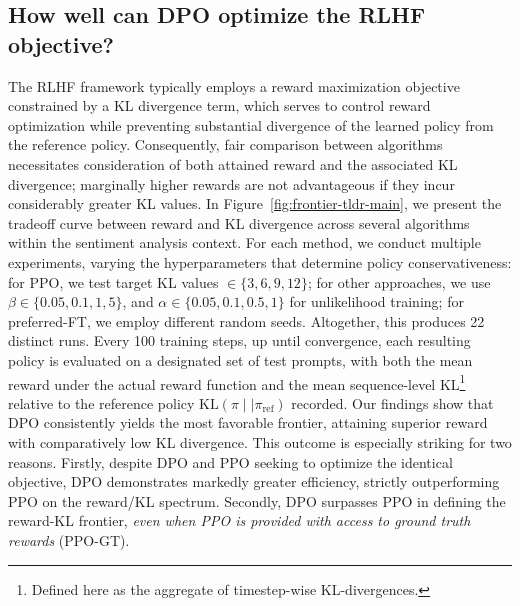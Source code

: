\subsection{How well can DPO optimize the RLHF objective?}

The RLHF framework typically employs a reward maximization objective constrained by a KL divergence term, which serves to control reward optimization while preventing substantial divergence of the learned policy from the reference policy. Consequently, fair comparison between algorithms necessitates consideration of both attained reward and the associated KL divergence; marginally higher rewards are not advantageous if they incur considerably greater KL values. In Figure~\ref{fig:frontier-tldr-main}, we present the tradeoff curve between reward and KL divergence across several algorithms within the sentiment analysis context. For each method, we conduct multiple experiments, varying the hyperparameters that determine policy conservativeness: for PPO, we test target KL values $\in\{3,6,9,12\}$; for other approaches, we use $\beta \in \{0.05,0.1,1,5\}$, and $\alpha\in\{0.05,0.1,0.5,1\}$ for unlikelihood training; for preferred-FT, we employ different random seeds. Altogether, this produces 22 distinct runs. Every 100 training steps, up until convergence, each resulting policy is evaluated on a designated set of test prompts, with both the mean reward under the actual reward function and the mean sequence-level KL\footnote{Defined here as the aggregate of timestep-wise KL-divergences.} relative to the reference policy $\text{KL}\left(\pi\mid \mid \pi_\text{ref}\right)$ recorded. Our findings show that DPO consistently yields the most favorable frontier, attaining superior reward with comparatively low KL divergence. This outcome is especially striking for two reasons. Firstly, despite DPO and PPO seeking to optimize the identical objective, DPO demonstrates markedly greater efficiency, strictly outperforming PPO on the reward/KL spectrum. Secondly, DPO surpasses PPO in defining the reward-KL frontier, \emph{even when PPO is provided with access to ground truth rewards} (PPO-GT).

